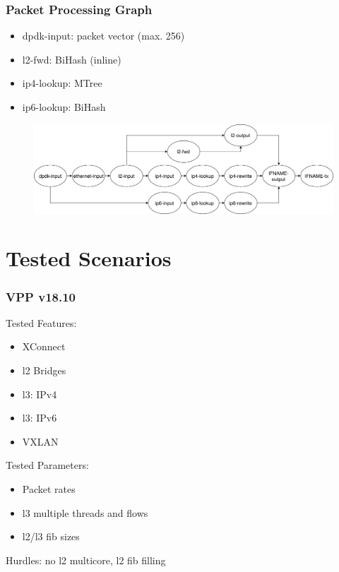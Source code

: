 \begin{frame}
    \frametitle{Packet Processing Graph}

    \begin{itemize}
        \item{dpdk-input: packet vector (max. 256)}
        \item{l2-fwd: BiHash (inline)}
        \item{ip4-lookup: MTree}
        \item{ip6-lookup: BiHash}
    \end{itemize}

    \begin{figure}
    \noindent\hspace{1mm}\includegraphics[width=\linewidth]{pics/vpp-nodes-horizontal.png}
    \label{nodegraph}
    \end{figure}
\end{frame}

\section{Tested Scenarios}

\begin{frame}
    \frametitle{VPP v18.10}

    Tested Features:
    \begin{itemize}
        \item XConnect
        \item l2 Bridges
        \item l3: IPv4
        \item l3: IPv6
        \item VXLAN
    \end{itemize}

    Tested Parameters: 
    \begin{itemize}
        \item Packet rates
        \item l3 multiple threads and flows
        \item l2/l3 fib sizes
    \end{itemize}

    Hurdles: no l2 multicore, l2 fib filling


\end{frame}

